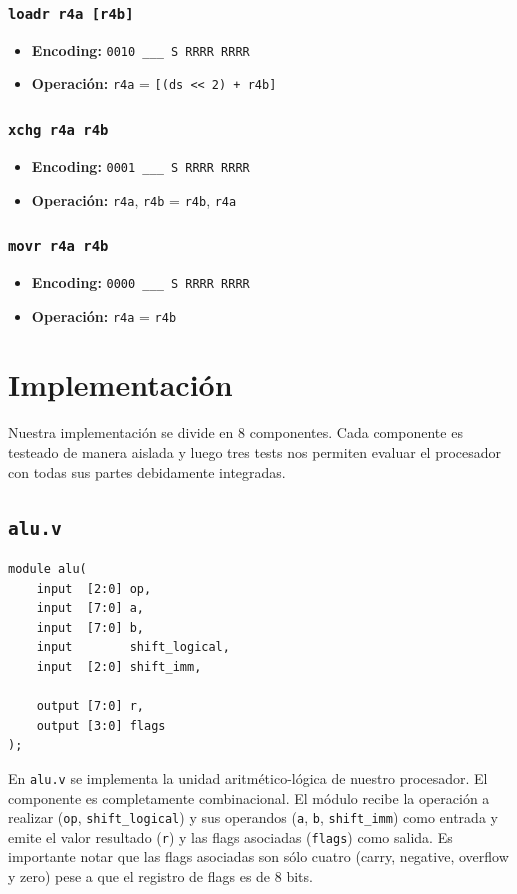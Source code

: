 \documentclass{article}
\begin{document}
\subsubsection{\texttt{loadr r4a [r4b]}}
\begin{itemize}
    \item \textbf{Encoding:} \texttt{0010 \_\_\_ S RRRR RRRR}
    \item \textbf{Operación:} \texttt{r4a} = \texttt{[(ds << 2) + r4b]}
\end{itemize}

\subsubsection{\texttt{xchg r4a r4b}}
\begin{itemize}
    \item \textbf{Encoding:} \texttt{0001 \_\_\_ S RRRR RRRR}
    \item \textbf{Operación:} \texttt{r4a}, \texttt{r4b} = \texttt{r4b}, \texttt{r4a}
\end{itemize}

\subsubsection{\texttt{movr r4a r4b}}
\begin{itemize}
    \item \textbf{Encoding:} \texttt{0000 \_\_\_ S RRRR RRRR}
    \item \textbf{Operación:} \texttt{r4a} = \texttt{r4b}
\end{itemize}

\section{Implementación}
Nuestra implementación se divide en 8 componentes. Cada componente es testeado de manera aislada y luego tres tests nos permiten evaluar el procesador con todas sus partes debidamente integradas.

\subsection{\texttt{alu.v}}
\begin{verbatim}
module alu(
    input  [2:0] op,          
    input  [7:0] a,              
    input  [7:0] b,             
    input        shift_logical,  
    input  [2:0] shift_imm,   
      
    output [7:0] r,           
    output [3:0] flags         
);
\end{verbatim}
En \texttt{alu.v} se implementa la unidad aritmético-lógica de nuestro procesador. El componente es completamente combinacional. El módulo recibe la operación a realizar (\texttt{op}, \texttt{shift\_logical}) y sus operandos (\texttt{a}, \texttt{b}, \texttt{shift\_imm}) como entrada y emite el valor resultado (\texttt{r}) y las flags asociadas (\texttt{flags}) como salida. Es importante notar que las flags asociadas son sólo cuatro (carry, negative, overflow y zero) pese a que el registro de flags es de 8 bits.
\end{document}
